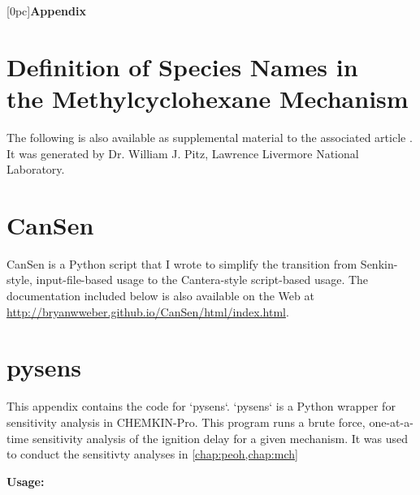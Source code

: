 \documentclass[12pt, letterpaper, oneside, draft]{book}
\begin{document}
\begin{appendices}
{}
[0pc]{}{\bfseries Appendix \thecontentslabel\quad}{}{\contentspage}
\chapter[Definition of Species Names in the Methylcyclohexane Mechanism]%
{Definition of Species Names in\\the Methylcyclohexane Mechanism}
\label{app:mch-dict}
The following is also available as supplemental material to the associated article \cite{Weber2014}.
It was generated by Dr. William J. Pitz, Lawrence Livermore National Laboratory.



\chapter{CanSen}
\label{app:cansen}
CanSen is a Python script that I wrote to simplify the transition from
Senkin-style, input-file-based usage to the Cantera-style script-based usage.
The documentation included below is also available on the Web at
\url{http://bryanwweber.github.io/CanSen/html/index.html}.



\chapter{pysens}
\begin{singlespace}
{\setlength{\parindent}{0pt}
\DefineShortVerb[commandchars=\\\{\}]{\`}
This appendix contains the code for `pysens`. `pysens` is a Python wrapper
for sensitivity analysis in CHEMKIN-Pro. This program runs a brute
force, one-at-a-time sensitivity analysis of the ignition delay for a
given mechanism. It was used to conduct the sensitivty analyses in
\cref{chap:peoh,chap:mch}

\blankline

{\large \textbf{Usage:}}

}
\end{singlespace}
\end{appendices}
\end{document}
